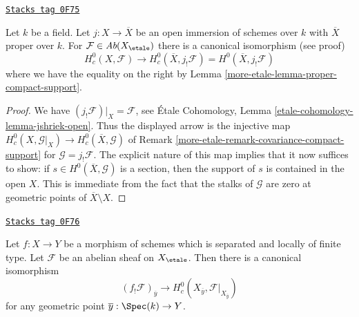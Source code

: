 \begin{lemma}
\label{more-etale-lemma-compactify-compact-support}
\href{https://stacks.math.columbia.edu/tag/0F75}{\texttt{Stacks tag 0F75}}

Let $k$ be a field. Let $j : X \to \overline{X}$ be an open
immersion of schemes over $k$ with $\overline{X}$ proper over $k$.
For $\mathcal{F} \in \textit{Ab}(X_\etale)$
there is a canonical isomorphism (see proof)
$$
H^0_c(X, \mathcal{F}) \longrightarrow
H^0_c(\overline{X}, j_!\mathcal{F}) =
H^0(\overline{X}, j_!\mathcal{F})
$$
where we have the equality on the right by
Lemma \ref{more-etale-lemma-proper-compact-support}.
\end{lemma}

\begin{proof}
We have $(j_!\mathcal{F})|_X = \mathcal{F}$, see
\'Etale Cohomology, Lemma \ref{etale-cohomology-lemma-jshriek-open}.
Thus the displayed arrow is the injective map
$H^0_c(X, \mathcal{G}|_X) \to H^0_c(\overline{X}, \mathcal{G})$
of Remark \ref{more-etale-remark-covariance-compact-support}
for $\mathcal{G} = j_!\mathcal{F}$. The explicit nature
of this map implies that it now suffices to show: if
$s \in H^0(\overline{X}, \mathcal{G})$ is a section, then the support of
$s$ is contained in the open $X$. This is immediate from the fact
that the stalks of $\mathcal{G}$ are zero at geometric
points of $\overline{X} \setminus X$.
\end{proof}

\begin{lemma}
\label{more-etale-lemma-stalk-f-shriek-separated}
\href{https://stacks.math.columbia.edu/tag/0F76}{\texttt{Stacks tag 0F76}}

Let $f : X \to Y$ be a morphism of schemes which is separated and
locally of finite type. Let $\mathcal{F}$ be an abelian sheaf on
$X_\etale$. Then there is a canonical isomorphism
$$
(f_!\mathcal{F})_{\overline{y}}
\longrightarrow
H^0_c(X_{\overline{y}}, \mathcal{F}|_{X_{\overline{y}}})
$$
for any geometric point $\overline{y} : \Spec(k) \to Y$.
\end{lemma}

